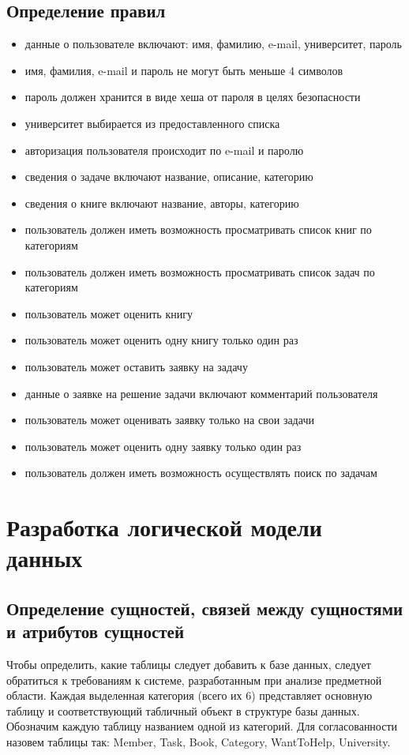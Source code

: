 \subsection{Определение правил}
\begin{itemize}
\item данные о пользователе включают: имя, фамилию, e-mail, университет, пароль
\item имя, фамилия, e-mail и пароль не могут быть меньше 4 символов
\item пароль должен хранится в виде хеша от пароля в целях безопасности
\item университет выбирается из предоставленного списка
\item авторизация пользователя происходит по e-mail и паролю
\item сведения о задаче включают название, описание, категорию
\item сведения о книге включают название, авторы, категорию
\item пользователь должен иметь возможность просматривать список книг по категориям
\item пользователь должен иметь возможность просматривать список задач по категориям
\item пользователь может оценить книгу
\item пользователь может оценить одну книгу только один раз
\item пользователь может оставить заявку на задачу
\item данные о заявке на решение задачи включают комментарий пользователя
\item пользователь может оценивать заявку только на свои задачи
\item пользователь может оценить одну заявку только один раз
\item пользователь должен иметь возможность осуществлять поиск по задачам
\end{itemize}

\section{Разработка логической модели данных}

\subsection{Определение сущностей, связей между сущностями и атрибутов сущностей}

Чтобы определить, какие таблицы следует добавить к базе данных, следует обратиться к требованиям к системе, разработанным при анализе предметной области. Каждая выделенная категория (всего их 6) представляет основную таблицу и соответствующий табличный объект в структуре базы данных. Обозначим каждую таблицу названием одной из категорий. Для согласованности назовем таблицы так: Member, Task, Book, Category, WantToHelp, University. 


